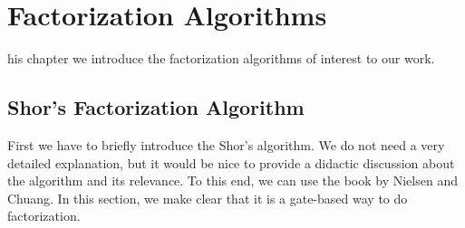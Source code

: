 \chapter{Factorization Algorithms}
\label{Chapter:Factorization}


his chapter we introduce the factorization algorithms of interest to our work.
\lipsum[1]



\section{Shor's Factorization Algorithm}

First we have to briefly introduce the Shor's algorithm. We do not need a very detailed explanation, but it would be nice to provide a didactic discussion about the algorithm and its relevance. To this end, we can use the book by Nielsen and Chuang. In this section, we make clear that it is a gate-based way to do factorization.

\lipsum[1]